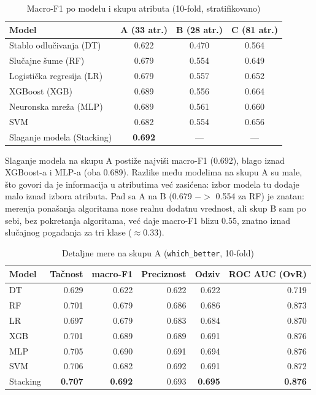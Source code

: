 \documentclass[12pt, a4paper]{article}
\begin{document}
\begin{table}[H]
\centering
\caption{Macro-F1 po modelu i skupu atributa (10-fold, stratifikovano)}
\begin{tabular}{lccc}
\toprule
\textbf{Model} & \textbf{A (33 atr.)} & \textbf{B (28 atr.)} & \textbf{C (81 atr.)} \\
\midrule
Stablo odlučivanja (DT)   & 0.622 & 0.470 & 0.564 \\
Slučajne šume (RF)        & 0.679 & 0.554 & 0.649 \\
Logistička regresija (LR) & 0.679 & 0.557 & 0.652 \\
XGBoost (XGB)              & 0.689 & 0.556 & 0.664 \\
Neuronska mreža (MLP)      & 0.689 & 0.561 & 0.660 \\
SVM                        & 0.682 & 0.554 & 0.656 \\
Slaganje modela (Stacking) & \textbf{0.692} & --- & --- \\
\bottomrule
\end{tabular}
\end{table}

Slaganje modela na skupu A postiže najviši macro-F1 (0.692), blago iznad XGBoost-a i MLP-a
(oba 0.689). Razlike među modelima na skupu A su male, što govori da je informacija u atributima
već zasićena: izbor modela tu dodaje malo iznad izbora atributa. Pad sa A na B
(0.679 $->$ 0.554 za RF) je znatan: merenja ponašanja algoritama nose realnu dodatnu
vrednost, ali skup B sam po sebi, bez pokretanja algoritama, već daje macro-F1 blizu 0.55,
znatno iznad slučajnog pogađanja za tri klase ($\approx 0.33$).

\begin{table}[H]
\centering
\caption{Detaljne mere na skupu A (\texttt{which\_better}, 10-fold)}
\begin{tabular}{lrrrrr}
\toprule
\textbf{Model} & \textbf{Tačnost} & \textbf{macro-F1} & \textbf{Preciznost} & \textbf{Odziv} & \textbf{ROC AUC (OvR)} \\
\midrule
DT       & 0.629 & 0.622 & 0.622 & 0.622 & 0.719 \\
RF       & 0.701 & 0.679 & 0.686 & 0.686 & 0.873 \\
LR       & 0.697 & 0.679 & 0.683 & 0.684 & 0.870 \\
XGB      & 0.701 & 0.689 & 0.689 & 0.691 & 0.876 \\
MLP      & 0.705 & 0.690 & 0.691 & 0.694 & 0.876 \\
SVM      & 0.706 & 0.682 & 0.692 & 0.691 & 0.872 \\
Stacking & \textbf{0.707} & \textbf{0.692} & 0.693 & \textbf{0.695} & \textbf{0.876} \\
\bottomrule
\end{tabular}
\end{table}
\end{document}
